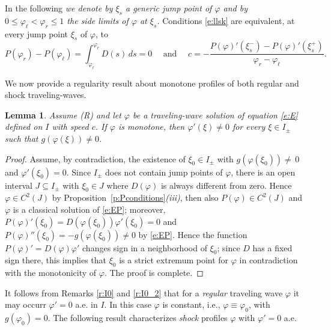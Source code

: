 \documentclass[11pt,a4paper]{article}
\newtheorem{lemma}{Lemma}[section]
\renewcommand{\phi}{\varphi}
\begin{document}
In the following {\em we denote by $\xi_s$ a generic jump point of $\phi$ and by $0\le \phi_\ell<\phi_r \le 1$ the side limits of $\phi$ at $\xi_s$.} Conditions \eqref{e:llsk} are equivalent, at every jump point $\xi_s$ of $\phi$, to 
\begin{equation}\label{e:hypo}
P(\phi_r)-P(\phi_{\ell})=\int_{\phi_\ell}^{\phi_r}D(s)\,d s=0
\quad \mbox{ and } \quad
c=-\frac{\displaystyle P(\varphi)'(\xi_s^-)-P(\phi)'(\xi_s^+)}{\phi_r-\phi_\ell}.
\end{equation}

We now provide a regularity result about monotone profiles of both regular and shock traveling-waves. 


\begin{lemma}\label{l:Dphine0} Assume {\rm (R)} and let $\phi$ be a traveling-wave solution of equation \eqref{e:E} defined on $I$ with speed $c$. If $\phi$ is monotone, then  $\phi'(\xi) \ne 0$ for every $\xi \in I_{\pm}$ such that $g(\phi(\xi))\neq 0$.
\end{lemma}
%
\begin{proof} Assume, by contradiction, the existence of $\xi_0 \in I_{\pm}$ with $g\left(\phi(\xi_0)\right)\ne \, 0$ and $\phi'(\xi_0)=0$. Since  $ I_{\pm}$ does not contain jump points of $\phi$, there is an open interval $J\subseteq I_{\pm}$ with $\xi_0 \in J $  where $D(\phi)$ is always different from zero. Hence $\phi\in C^2(J)$ by Proposition~\ref{p:Pconditions}{\em (iii)}, then also $P(\phi)\in C^2(J)$ and $\phi$ is a classical solution of \eqref{e:EP}; moreover, $P(\phi)'(\xi_0)=D\left(\phi(\xi_0)\right)\phi'(\xi_0)=0$ and $P(\phi)''(\xi_0)=-g\left(\phi(\xi_0)\right)\ne 0$ by \eqref{e:EP}. Hence the function $P(\phi)'=D(\phi)\phi'$ changes sign in a neighborhood of $\xi_0$; since $D$ has a fixed sign there, this implies that $\xi_0$ is a strict extremum point for $\phi$ in contradiction with the monotonicity of $\phi$. The proof is complete.
\end{proof}

It follows from Remarks \ref{r:I0} and \ref{r:I0_2} that for a {\em regular} traveling wave  $\phi$ it may occurr $\phi'=0$ a.e.\! in $I$. In this case $\phi$ is constant, i.e., $\phi \equiv \phi_0$, with $g(\phi_0)=0$.   The following result characterizes {\em shock}  profiles $\phi$ with $\phi'=0$ a.e.
\end{document}
